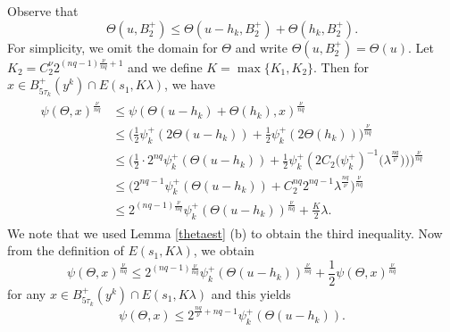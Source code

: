 \documentclass[11pt, reqno]{amsart}
\numberwithin{equation}{section}
\begin{document}
Observe that
$$\Theta(u,B_{2}^{+})\le \Theta(u-h_{k},B_{2}^{+})+\Theta(h_{k},B_{2}^{+}). $$
For simplicity, we omit the domain for $\Theta$ and write $\Theta(u,B_{2}^{+}) =\Theta(u) $.
Let $K_2=C_{2}^{\nu}2^{(nq-1)\frac{\nu}{nq}+1}$ and we define $K=\max\{K_1,K_2\}$.
Then for $x \in B_{5\tau_{k}}^{+}(y^{k}) \cap  E(s_{1},K\lambda)$, we have
\begin{align}\label{labad1}\begin{split}
\psi(\Theta, x)^{\frac{\nu}{nq}}&\le \psi(\Theta(u-h_{k})+\Theta(h_{k}), x)^{\frac{\nu}{nq}}
\\ & \le \bigg( \frac{1}{2} \psi_{k}^{+}(2\Theta(u-h_{k}))+ \frac{1}{2} \psi_{k}^{+}(2\Theta(h_{k}))\bigg)^{\frac{\nu}{nq}}
\\& \le \bigg( \frac{1}{2}\cdot 2^{nq} \psi_{k}^{+}(\Theta(u-h_{k}))+ \frac{1}{2} \psi_{k}^{+}(2C_{2}\big(\psi_{k}^{+})^{-1}\big( \lambda^{\frac{nq}{\nu}})\big)\bigg)^{\frac{\nu}{nq}}
\\ & \le \bigg( 2^{nq-1} \psi_{k}^{+}(\Theta(u-h_{k}))+ C_{2}^{nq}2^{nq-1} \lambda^{\frac{nq}{\nu}}\bigg)^{\frac{\nu}{nq}}
\\ & \le  2^{(nq-1)\frac{\nu}{nq}} \psi_{k}^{+}(\Theta(u-h_{k}))^{\frac{\nu}{nq}}+\frac{K}{2}
\lambda. \end{split}
\end{align} 
We note that we used Lemma \ref{thetaest} (b) to obtain the third inequality.
Now from the definition of $ E(s_{1},K\lambda)$, we obtain
$$ \psi(\Theta, x)^{\frac{\nu}{nq}} \le  2^{(nq-1)\frac{\nu}{nq}} \psi_{k}^{+}(\Theta(u-h_{k}))^{\frac{\nu}{nq}}+\frac{1}{2}\psi(\Theta, x)^{\frac{\nu}{nq}} $$
 for any $x \in B_{5\tau_{k}}^{+}(y^{k}) \cap  E(s_{1},K\lambda)$
and this yields
$$  \psi(\Theta, x) \le 2^{\frac{nq}{\nu}+nq-1}\psi_{k}^{+}(\Theta(u-h_{k})).$$
\end{document}
